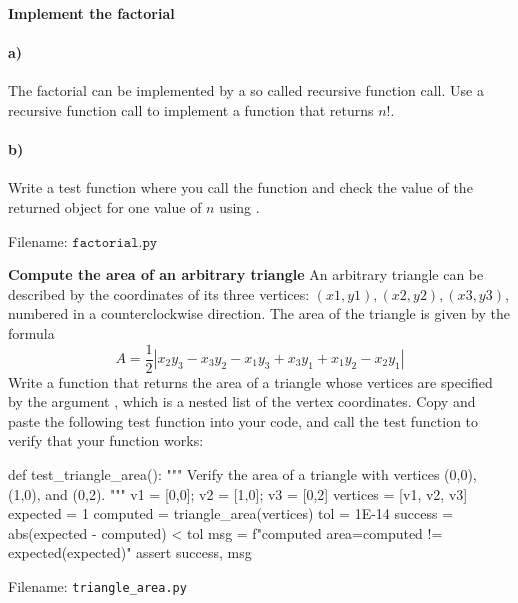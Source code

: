 \begin{Problem}{\textbf{Implement the factorial}}
\paragraph{a)} The factorial can be implemented by a so called recursive function
call. Use a recursive function call to implement a function  that returns $n!$.

\paragraph{b)} Write a test function where you call the 
function and check the value of the returned object for one value of $n$ using
.

Filename: $\texttt{factorial.py}$
\end{Problem}

\begin{Problem}{\textbf{Compute the area of an arbitrary triangle}} \label{triangle}
An arbitrary triangle can be described by the coordinates of its three vertices: $(x1, y1), (x2, y2), (x3, y3)$, numbered in a counterclockwise direction. The area of the triangle is given by the formula
\[
A = \frac{1}{2}|x_2y_3-x_3y_2-x_1y_3 + x_3y_1 + x_1y_2 - x_2y_1 |
\]
Write a function  that returns
the area of a triangle whose vertices are specified by the argument ,
which is a nested list of the vertex coordinates. Copy and paste the following
test function into your code, and call the test function to verify that
your  function works:
\begin{python}
def test_triangle_area():
    """
    Verify the area of a triangle with vertices
    (0,0), (1,0), and (0,2).
    """
    v1 = [0,0];  v2 = [1,0];  v3 = [0,2]
    vertices = [v1, v2, v3]
    expected = 1
    computed = triangle_area(vertices)
    tol = 1E-14
    success = abs(expected - computed) < tol
    msg = f"computed area={computed} != {expected}(expected)"
    assert success, msg
\end{python}

Filename: \texttt{triangle\_area.py}
\end{Problem}


